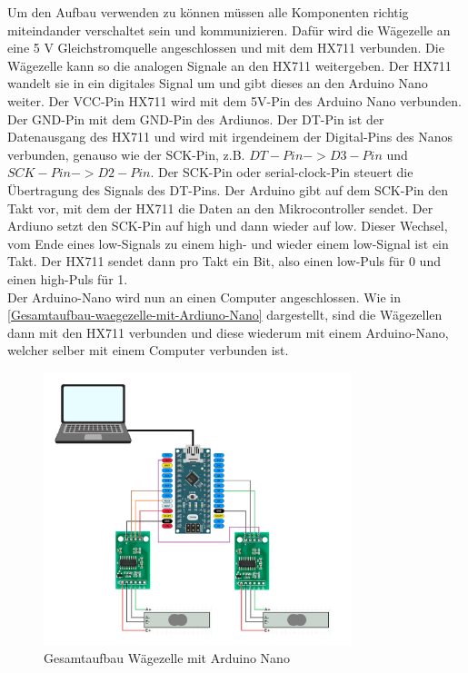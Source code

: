 Um den Aufbau verwenden zu können müssen alle Komponenten richtig miteindander verschaltet sein und kommunizieren.
Dafür wird die Wägezelle an eine 5 V Gleichstromquelle angeschlossen und mit dem HX711 verbunden.
Die Wägezelle kann so die analogen Signale an den HX711 weitergeben.
Der HX711 wandelt sie in ein digitales Signal um und gibt dieses an den Arduino Nano weiter.
Der VCC-Pin HX711 wird mit dem 5V-Pin des Arduino Nano verbunden.
Der GND-Pin mit dem GND-Pin des Ardiunos.
Der DT-Pin ist der Datenausgang des HX711 und wird mit irgendeinem der Digital-Pins des Nanos verbunden, genauso wie der SCK-Pin, z.B. $DT-Pin -> D3-Pin$ und $SCK-Pin -> D2-Pin$.
Der SCK-Pin oder serial-clock-Pin steuert die Übertragung des Signals des DT-Pins.
Der Arduino gibt auf dem SCK-Pin den Takt vor, mit dem der HX711 die Daten an den Mikrocontroller sendet.
Der Ardiuno setzt den SCK-Pin auf high und dann wieder auf low.
Dieser Wechsel, vom Ende eines low-Signals zu einem high- und wieder einem low-Signal ist ein Takt.
Der HX711 sendet dann pro Takt ein Bit, also einen low-Puls für 0 und einen high-Puls für 1.
\\
Der Arduino-Nano wird nun an einen Computer angeschlossen.
Wie in \autoref{Gesamtaufbau-waegezelle-mit-Ardiuno-Nano} dargestellt, sind die Wägezellen dann mit den HX711 verbunden und diese wiederum mit einem Arduino-Nano, welcher selber mit einem Computer verbunden ist.
\begin{figure}[h!]
    \centering
    \includegraphics[width=0.8\textwidth]{img/Schaltungs-Aufbau.png}
    \caption{Gesamtaufbau Wägezelle mit Arduino Nano}
    \label{Gesamtaufbau-waegezelle-mit-Arduino-Nano}
\end{figure}
